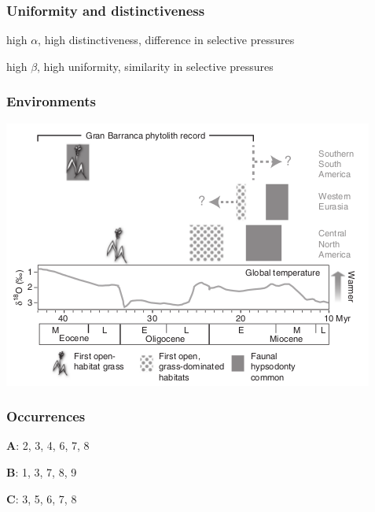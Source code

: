 \documentclass{beamer}
\begin{document}
\begin{frame}
  \frametitle{Uniformity and distinctiveness}
  
  high \(\alpha\), high distinctiveness, difference in selective pressures
  
  \vspace{1cm}

  high \(\beta\), high uniformity, similarity in selective pressures

\end{frame}

\begin{frame}
  \frametitle{Environments}

  \includegraphics[height=0.8\textheight,width=\textwidth,keepaspectratio=true]{figure/stromberg}

  \tiny{}
\end{frame}


\begin{frame}
  \frametitle{Occurrences}
  \begin{center}
    \textbf{A}: {2, 3, 4, 6, 7, 8}

    \vspace{0.5cm}

    \textbf{B}: {1, 3, 7, 8, 9}

    \vspace{0.5cm}

    \textbf{C}: {3, 5, 6, 7, 8}
  \end{center}

\end{frame}
\end{document}
